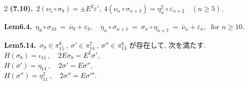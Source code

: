 \documentclass[10pt, leqno]{ltjsarticle}
\numberwithin{equation}{section}
\theoremstyle{plain}
\theoremstyle{definition}
\theoremstyle{remark}
\begin{document}
\begin{paracol}{2}
\noindent
\textbf{(7.10).}\
\(2(\nu_{5}\circ\sigma_{8})=\pm E^{2}\varepsilon',\
4(\nu_{n}\circ\sigma_{n+3})=\eta_{n}^{2}\circ\varepsilon_{n+2}\quad(n\ge5).\)

\noindent
\textbf{Lem6.4.}\
\(
\eta_9\circ \sigma_{10}\ =\ \overline\nu_9+\varepsilon_9,
\quad \eta_n\circ \sigma_{n+1}\ =\ 
\sigma_n \circ\eta_{n+7}\ =\
\overline\nu_n+\varepsilon_n,\ \text{ for } n\ge10.
\)

\noindent
\textbf{Lem5.14.}\
\(\sigma_{8}\in\pi^{8}_{15}\ , \ \sigma'\in\pi^{7}_{14}\ , \ \sigma''\in\pi^{6}_{13}\) 
が存在して, 次を満たす. \\
\(H(\sigma_{8})=\iota_{15} \ ,\quad 2E\sigma_{8}=E^{2}\sigma',\)\\
\(H(\sigma')=\eta_{13} \ ,\quad 2\sigma'=E\sigma'',\)\\
\(H(\sigma'')=\eta_{11}^2 \ ,\quad 2\sigma''=E\sigma''' .\)





\end{paracol}
\end{document}
